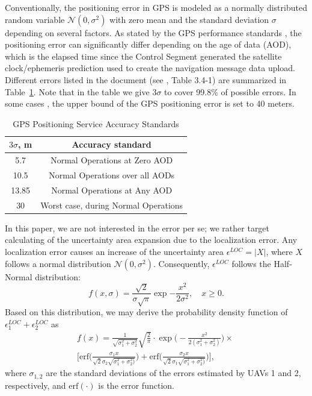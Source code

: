 \documentclass[conference]{IEEEtran}
\begin{document}
Conventionally, the positioning error in GPS is modeled as a normally distributed random variable $\mathcal{N}(0,\sigma^2)$ with zero mean and the standard deviation $\sigma$ depending on several factors. As stated by the GPS performance standards \cite{GPS_SPS_2020}, the positioning error can significantly differ depending on the age of data (AOD), which is the elapsed time since the Control Segment generated the satellite clock/ephemeris prediction used to create the navigation message data upload. Different errors listed in the document (see \cite{GPS_SPS_2020}, Table 3.4-1) are summarized in Table~\ref{tab:gps}. Note that in the table we give $3\sigma$ to cover 99.8\% of possible errors. In some cases \cite{Bubbles21}, the upper bound of the GPS positioning error is set to 40 meters.
\begin{table}[]
     \caption{GPS Positioning Service Accuracy Standards}   \centering
    \begin{tabular}{c|c}
        $3\sigma$, m & Accuracy standard \\
        \hline
         5.7& Normal Operations at Zero AOD\\
         10.5&Normal Operations over all AODs\\
         13.85&Normal Operations at Any AOD\\
         30&Worst case, during Normal Operations\\
    \end{tabular}

    \label{tab:gps}
\end{table}

In this paper, we are not interested in the error per se; we rather target calculating of the uncertainty area expansion due to the localization error. Any localization error causes an increase of the uncertainty area $\epsilon^{LOC}=|X|$, where $X$ follows a normal distribution $\mathcal{N}(0,\sigma^2)$. Consequently, $\epsilon^{LOC}$ follows the Half-Normal distribution:
\begin{equation}
    f(x,\sigma)=\frac{\sqrt{2}}{\sigma\sqrt{\pi}}\exp{-\frac{x^2}{2\sigma^2}},  \quad   x\geq0.
\end{equation}
Based on this distribution, we may derive the probability density function of $\epsilon^{LOC}_1+\epsilon^{LOC}_2$ as
\begin{eqnarray}
    f(x)=\frac{1}{\sqrt{\sigma^2_1+\sigma^2_2}} \sqrt{\frac{2}{\pi}} \cdot \exp{\Big(-\frac{x^2}{2(\sigma^2_1+\sigma^2_2)}}\Big) \times \nonumber\ \\
    \Bigg[ \mathrm{erf} \Bigg(\frac{\sigma_1 x}{\sqrt{2}\sigma_2 \sqrt{\sigma_1^2+\sigma^2_2)}}\Bigg)+
    \mathrm{erf} \Bigg(\frac{\sigma_2 x}{\sqrt{2}\sigma_1 \sqrt{\sigma_1^2+\sigma^2_2)}}\Bigg) \Bigg],
\end{eqnarray}
where $\sigma_{1,2}$ are the standard deviations of the errors estimated by UAVs 1 and 2, respectively, and $\mathrm{erf}(\cdot)$ is the error function.
\end{document}
